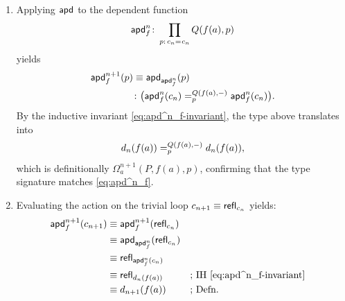 \begin{defn}
\begin{description}[font=\normalfont\scshape]
\begin{enumerate}[(1)]
            \item Applying $\mathsf{apd}$ to the dependent function
            \[
                \fun{apd}^n_f\colon
                    \prod_{p\colon c_n\eq{}c_n}Q(f(a),p)
            \]
            yields
            \begin{align*}
                \fun{apd}^{n+1}_f(p)
                    &\equiv\fun{apd}_{\fun{apd}^n_f}(p)\\
                    &\colon\bigl(
                        \fun{apd}^n_f(c_n)
                        \eqt p{Q(f(a),\dummy)}
                        \fun{apd}^n_f(c_n)
                    \bigr).
            \end{align*}
            By the inductive invariant \eqref{eq:apd^n_f-invariant}, the type above translates into
            \[
                d_n(f(a))
                    =_{p}^{Q(f(a),{\mathord-})}
                d_n(f(a)),
            \]
            which is definitionally $\Omega^{n+1}_a(P,f(a),p)$, confirming that the type signature matches \eqref{eq:apd^n_f}.

            \item Evaluating the action on the trivial loop $c_{n+1}\equiv\mathsf{refl}_{c_n}$ yields:
            \begin{align*}
                \mathsf{apd}^{n+1}_f(c_{n+1})
                    &\equiv\mathsf{apd}^{n+1}_f(
                        \mathsf{refl}_{c_n}
                    )\\
                    &\equiv\mathsf{apd}_{\mathsf{apd}^n_f}(
                        \mathsf{refl}_{c_n}
                        )\\
                    &\equiv\mathsf{refl}_{\mathsf{apd}^n_f(c_n)}\\
                    &\equiv\mathsf{refl}_{d_n(f(a))}
                        &&\text{; IH \eqref{eq:apd^n_f-invariant}}\\
                    &\equiv d_{n+1}(f(a))
                        &&\text{; Defn.}
            \end{align*}
        \end{enumerate}
    \end{description}
\end{defn}

\label{n-sphere-induction}
